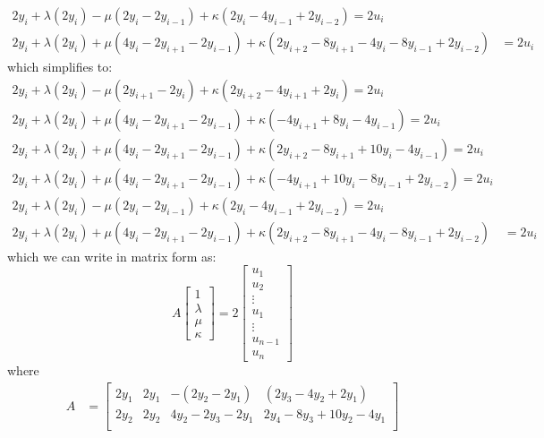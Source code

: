 \documentclass[12pt]{exam}
\begin{document}
\begin{questions}
\begin{solution}
\begin{enumerate}[label=(\alph*)]
\begin{align*}
      2y_i + \lambda (2y_i) - \mu(2y_i - 2y_{i-1}) + \kappa(2y_i - 4y_{i-1} + 2y_{i-2}) = 2u_i \tag{$i = n$} \\
      2y_i + \lambda (2y_i) + \mu(4y_i - 2y_{i+1} - 2y_{i-1}) + \kappa (2y_{i+2} - 8y_{i+1} - 4y_i - 8y_{i-1} + 2y_{i-2}) &= 2u_i \tag{otherwise}
    \end{align*}
    which simplifies to:
     \begin{align*}
      2y_i +  \lambda (2y_i) - \mu(2y_{i+1} - 2y_i) + \kappa(2y_{i+2} - 4y_{i+1} + 2y_i) = 2u_i \tag{$i = 1$} \\
      2y_i + \lambda (2y_i) + \mu(4y_i - 2y_{i+1} - 2y_{i-1}) + \kappa(-4y_{i+1} + 8y_{i} -4y_{i-1}) = 2u_i \tag{$i=2, n = 3$} \\
      2y_i + \lambda (2y_i) + \mu(4y_i - 2y_{i+1} - 2y_{i-1}) + \kappa(2y_{i+2} - 8y_{i+1} + 10y_{i} -4y_{i-1} ) = 2u_i \tag{$i = 2, n > 3$} \\
      2y_i + \lambda (2y_i) + \mu(4y_i - 2y_{i+1} - 2y_{i-1}) + \kappa(-4y_{i+1} + 10y_i -8y_{i-1} + 2y_{i-2}) = 2u_i \tag{$i = n - 1, n > 3$} \\
      2y_i + \lambda (2y_i) - \mu(2y_i - 2y_{i-1}) + \kappa(2y_i - 4y_{i-1} + 2y_{i-2}) = 2u_i \tag{$i = n$} \\
      2y_i + \lambda (2y_i) + \mu(4y_i - 2y_{i+1} - 2y_{i-1}) + \kappa (2y_{i+2} - 8y_{i+1} - 4y_i - 8y_{i-1} + 2y_{i-2}) &= 2u_i \tag{otherwise}
    \end{align*}
    which we can write in matrix form as:
    \[
      A\begin{bmatrix}
        1 \\ \lambda \\ \mu \\ \kappa
      \end{bmatrix} = 
      2\begin{bmatrix}
        u_1 \\
        u_2 \\
        \vdots \\
        u_1 \\
        \vdots \\
        u_{n-1} \\
        u_{n}
      \end{bmatrix}
    \]
    where 
    \begin{align*}
      A &= \begin{bmatrix}
        2y_1 & 2y_1 & -(2y_{2} - 2y_1) & (2y_{3} - 4y_{2} + 2y_1) \\
        2y_2 & 2y_2 & 4y_2 - 2y_{3} - 2y_{1} & 2y_{4} - 8y_{3} + 10y_{2} -4y_{1} \\

\end{bmatrix}
\end{align*}
\end{enumerate}
\end{solution}
\end{questions}
\end{document}
